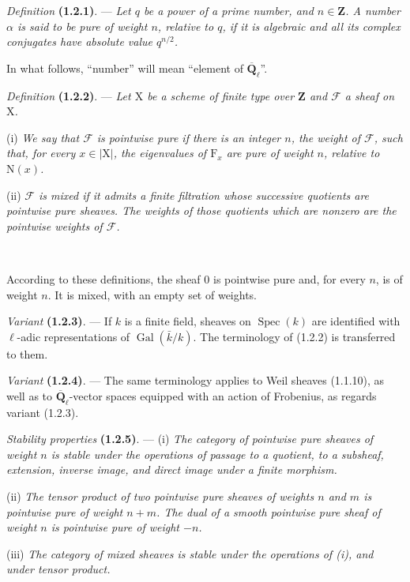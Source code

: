 \documentclass[11pt,leqno]{article}
\newcommand{\Page}[1]{\ifvmode\noindent\else\unskip\ \fi{\footnotesize\textcolor{gray}{[p.\,#1]}}\ \ignorespaces}
\begin{document}
\textit{Definition} \textbf{(1.2.1)}. — \textit{Let \(q\) be a power of a prime number, and \(n\in\mathbf{Z}\). A number \(\alpha\) is said to be \textup{pure of weight} \(n\), relative to \(q\), if it is algebraic and all its complex conjugates have absolute value \(q^{n/2}\).}

In what follows, “number” will mean “element of \(\overline{\mathbf{Q}}_\ell\)”.

\textit{Definition} \textbf{(1.2.2)}. — \textit{Let \(\mathrm{X}\) be a scheme of finite type over \(\mathbf{Z}\) and \(\mathscr{F}\) a sheaf on \(\mathrm{X}\).}

(i) \textit{We say that \(\mathscr{F}\) is \textup{pointwise pure} if there is an integer \(n\), the \textup{weight} of \(\mathscr{F}\), such that, for every \(x\in|\mathrm{X}|\), the eigenvalues of \(\mathrm{F}_x\) are pure of weight \(n\), relative to \(\mathrm{N}(x)\).}

(ii) \textit{\(\mathscr{F}\) is \textup{mixed} if it admits a finite filtration whose successive quotients are pointwise pure sheaves. The weights of those quotients which are nonzero are the \textup{pointwise weights} of \(\mathscr{F}\).}

\Page{154}

According to these definitions, the sheaf \(0\) is pointwise pure and, for every \(n\), is of weight \(n\). It is mixed, with an empty set of weights.

\textit{Variant} \textbf{(1.2.3)}. — If \(k\) is a finite field, sheaves on \(\operatorname{Spec}(k)\) are identified with \(\ell\)-adic representations of \(\operatorname{Gal}(\bar{k}/k)\). The terminology of (1.2.2) is transferred to them.

\textit{Variant} \textbf{(1.2.4)}. — The same terminology applies to Weil sheaves (1.1.10), as well as to \(\overline{\mathbf{Q}}_\ell\)-vector spaces equipped with an action of Frobenius, as regards variant (1.2.3).

\textit{Stability properties} \textbf{(1.2.5)}. — (i) \textit{The category of pointwise pure sheaves of weight \(n\) is stable under the operations of passage to a quotient, to a subsheaf, extension, inverse image, and direct image under a finite morphism.}

(ii) \textit{The tensor product of two pointwise pure sheaves of weights \(n\) and \(m\) is pointwise pure of weight \(n+m\). The dual of a smooth pointwise pure sheaf of weight \(n\) is pointwise pure of weight \(-n\).}

(iii) \textit{The category of mixed sheaves is stable under the operations of \textup{(i)}, and under tensor product.}
\end{document}
